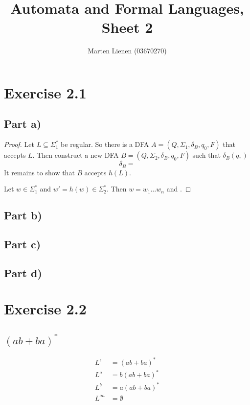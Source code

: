 \documentclass[10pt,a4paper]{article}
\title{Automata and Formal Languages, Sheet 2}
\author{Marten Lienen (03670270)}
\begin{document}
\maketitle

\section*{Exercise 2.1}

\subsection*{Part a)}

\begin{proof}
  Let $L \subseteq \Sigma_{1}^{*}$ be regular.
  So there is a DFA $A = (Q, \Sigma_{1}, \delta_{B}, q_{0}, F)$ that accepts $L$.
  Then construct a new DFA $B = (Q, \Sigma_{2}, \delta_{B}, q_{0}, F)$ such that
  $\delta_{B}(q, )$
  \begin{equation*}
    \delta_{B} =
  \end{equation*}
  It remains to show that $B$ accepts $h(L)$.

  Let $w \in \Sigma_{1}^{*}$ and $w' = h(w) \in \Sigma_{2}^{*}$.
  Then $w = w_{1} \dots w_{n}$ and $$.
\end{proof}

\subsection*{Part b)}

\subsection*{Part c)}

\subsection*{Part d)}

\section*{Exercise 2.2}

\subsection*{$(ab + ba)^{*}$}

\begin{align*}
  L^{\epsilon} & = (ab + ba)^{*}\\
  L^{a} & = b(ab + ba)^{*}\\
  L^{b} & = a(ab + ba)^{*}\\
  L^{aa} & = \emptyset
\end{align*}
\end{document}
